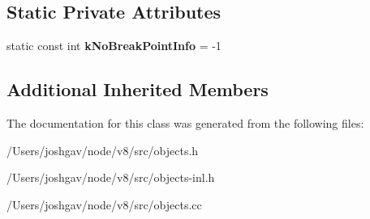 \subsection*{Static Private Attributes}
\begin{DoxyCompactItemize}
\item 
static const int {\bfseries k\+No\+Break\+Point\+Info} = -\/1\hypertarget{classv8_1_1internal_1_1_debug_info_a1f8b64172991747880ff69ee226fca59}{}\label{classv8_1_1internal_1_1_debug_info_a1f8b64172991747880ff69ee226fca59}

\end{DoxyCompactItemize}
\subsection*{Additional Inherited Members}


The documentation for this class was generated from the following files\+:\begin{DoxyCompactItemize}
\item 
/\+Users/joshgav/node/v8/src/objects.\+h\item 
/\+Users/joshgav/node/v8/src/objects-\/inl.\+h\item 
/\+Users/joshgav/node/v8/src/objects.\+cc\end{DoxyCompactItemize}
